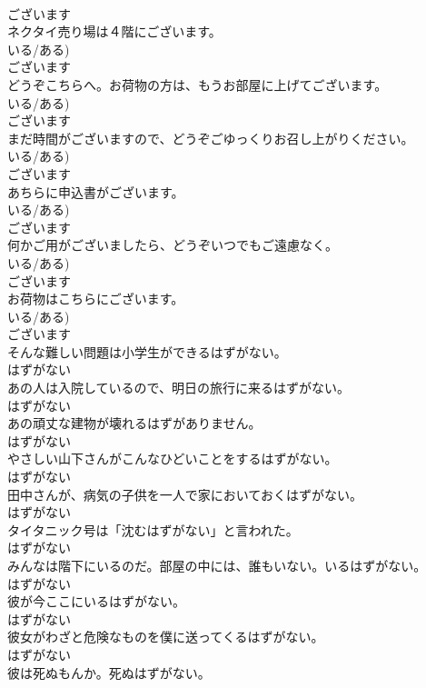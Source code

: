 \documentclass[8pt]{extreport}
\begin{document}
\begin{CJK}{UTF8}{min}
\\	ございます	
\\	ネクタイ売り場は４階にございます。	
\\	いる/ある)	
\\	ございます	
\\	どうぞこちらへ。お荷物の方は、もうお部屋に上げてございます。	
\\	いる/ある)	
\\	ございます	
\\	まだ時間がございますので、どうぞごゆっくりお召し上がりください。	
\\	いる/ある)	
\\	ございます	
\\	あちらに申込書がございます。	
\\	いる/ある)	
\\	ございます	
\\	何かご用がございましたら、どうぞいつでもご遠慮なく。	
\\	いる/ある)	
\\	ございます	
\\	お荷物はこちらにございます。	
\\	いる/ある)	
\\	ございます	
\\	そんな難しい問題は小学生ができるはずがない。	
\\	はずがない	
\\	あの人は入院しているので、明日の旅行に来るはずがない。	
\\	はずがない	
\\	あの頑丈な建物が壊れるはずがありません。	
\\	はずがない	
\\	やさしい山下さんがこんなひどいことをするはずがない。	
\\	はずがない	
\\	田中さんが、病気の子供を一人で家においておくはずがない。	
\\	はずがない	
\\	タイタニック号は「沈むはずがない」と言われた。	
\\	はずがない	
\\	みんなは階下にいるのだ。部屋の中には、誰もいない。いるはずがない。	
\\	はずがない	
\\	彼が今ここにいるはずがない。	
\\	はずがない	
\\	彼女がわざと危険なものを僕に送ってくるはずがない。	
\\	はずがない	
\\	彼は死ぬもんか。死ぬはずがない。	

\end{CJK}
\end{document}
